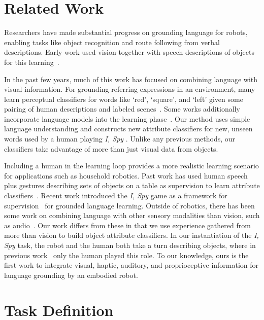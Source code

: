 \documentclass{article}
\newcommand{\ispy}{\textit{I, Spy} }
\begin{document}
\section{Related Work}

	Researchers have made substantial progress on grounding language for robots, enabling tasks like object recognition and route following from verbal descriptions. 
	Early work used vision together with speech descriptions of objects for this learning~\cite{roy:cogsci02}.

	In the past few years, much of this work has focused on combining language with visual information. 
	For grounding referring expressions in an environment, many learn perceptual classifiers for words like `red', `square', and `left' given some pairing of human descriptions and labeled scenes~\cite{liu:acl14,malinowski:nips14,mohan:acs13,sun:icra13,dindo:iros10}. 
	Some works additionally incorporate language models into the learning phase~\cite{spranger:ijcai15,krishnamurthy:acl13,perera:aaai13,matuszek:icml12}. 
	Our method uses simple language understanding and constructs new attribute classifiers for new, unseen words used by a human playing \ispy. 
	Unlike any previous methods, our classifiers take advantage of more than just visual data from objects.

	Including a human in the learning loop provides a more realistic learning scenario for applications such as household robotics. 
	Past work has used human speech plus gestures describing sets of objects on a table as supervision to learn attribute classifiers~\cite{matuszek:aaai14,kollar:rss13}. 
	Recent work introduced the \ispy game as a framework for supervision~\cite{parde:ijcai15} for grounded language learning. 
	Outside of robotics, there has been some work on combining language with other sensory modalities than vision, such as audio~\cite{kiela:emnlp15}. 
	Our work differs from these in that we use experience gathered from more than vision to build object attribute classifiers. 
	In our instantiation of the \ispy task, the robot and the human both take a turn describing objects, where in previous work~ only the human played this role. 
	To our knowledge, ours is the first work to integrate visual, haptic, auditory, and proprioceptive information for language grounding by an embodied robot.


\section{Task Definition}
\end{document}
